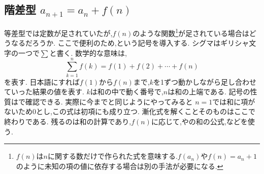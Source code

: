 
\subsection{\texorpdfstring{階差型  $a_{n+1}=a_n+f(n)$}{階差型}}\label{節：階差型}

  等差型では定数が足されていたが,$f(n)$のような関数\footnote{$f(n)$は$n$に関する数だけで作られた式を意味する.$f(a_n)$や$f(n)=a_n+1$のように未知の項の値に依存する場合は別の手法が必要になる.}が足されている場合はどうなるだろうか.
    ここで便利のため,という記号を導入する.
    シグマはギリシャ文字の一つで$\sum$と書く.
    数学的な意味は,
    \[
      \sum_{k=1}^{n}f(k)=f(1)+f(2)+\cdots+f(n)
    \]
    を表す.
    日本語にすれば$f(1)$から$f(n)$まで,$k$を1ずつ動かしながら足し合わせていった結果の値を表す.
    $k$は和の中で動く番号で,$n$は和の上端である.
    記号の性質はで確認できる.
    実際に今までと同じようにやってみると
    $n=1$では和に項がないため0とし,この式は初項にも成り立つ.
    漸化式を解くことそのものはここで終わりである.
    残るのは和の計算であり,$f(n)$に応じて,やの和の公式,などを使う.
    
